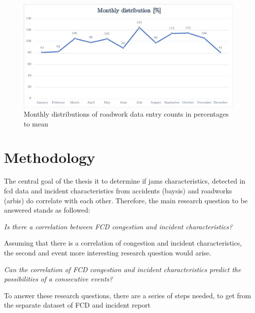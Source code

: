 \documentclass[a4paper,12pt]{report}
\begin{document}
\begin{figure}[h]
	\centering
	\includegraphics[scale=0.6]{./assets/arbis_dataset_monthly_percentage}
	\caption{Monthly distributions of roadwork data entry counts in percentages to mean}
	\label{img:arbis_dataset_monthly_percentage}
\end{figure}




\chapter{Methodology}
The central goal of the thesis it to determine if jams characteristics, detected in \acrshort{fcd} data and incident characteristics from accidents (\acrshort{baysis}) and roadworks (\acrshort{arbis}) do correlate with each other. Therefore, the main research question to be answered stands as followed:

\begin{center}
	\textit{Is there a correlation between FCD congestion and incident characteristics?}
\end{center}

\bigskip

\par Assuming that there is a correlation of congestion and incident characteristics, the second and event more interesting research question would arise.

\begin{center}
	\textit{Can the correlation of FCD congestion and incident characteristics predict the possibilities of a consecutive events?}
\end{center}

\bigskip

\par To answer these research questions, there are a series of steps needed, to get from the separate dataset of FCD and incident report
\end{document}
